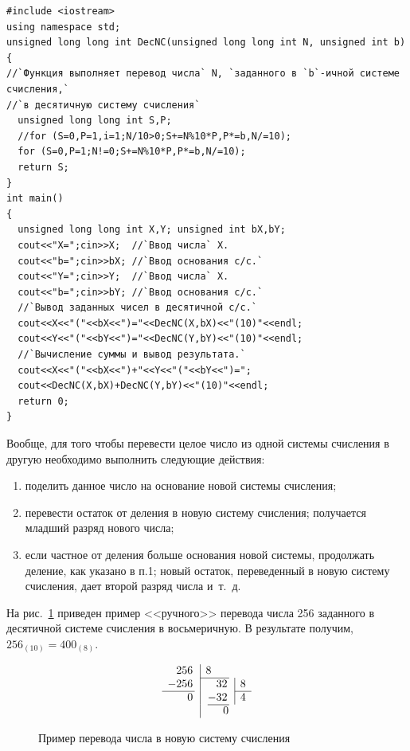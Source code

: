 \begin{lstlisting}
#include <iostream>
using namespace std;
unsigned long long int DecNC(unsigned long long int N, unsigned int b)
{
//`Функция выполняет перевод числа` N, `заданного в `b`-ичной системе счисления,` 
//`в десятичную систему счисления`
  unsigned long long int S,P;
  //for (S=0,P=1,i=1;N/10>0;S+=N%10*P,P*=b,N/=10);
  for (S=0,P=1;N!=0;S+=N%10*P,P*=b,N/=10);
  return S;
}
int main()
{
  unsigned long long int X,Y; unsigned int bX,bY;
  cout<<"X=";cin>>X;  //`Ввод числа` X.
  cout<<"b=";cin>>bX; //`Ввод основания с/с.`
  cout<<"Y=";cin>>Y;  //`Ввод числа` X.
  cout<<"b=";cin>>bY; //`Ввод основания с/с.`
  //`Вывод заданных чисел в десятичной с/с.`
  cout<<X<<"("<<bX<<")="<<DecNC(X,bX)<<"(10)"<<endl;
  cout<<Y<<"("<<bY<<")="<<DecNC(Y,bY)<<"(10)"<<endl;
  //`Вычисление суммы и вывод результата.`
  cout<<X<<"("<<bX<<")+"<<Y<<"("<<bY<<")=";
  cout<<DecNC(X,bX)+DecNC(Y,bY)<<"(10)"<<endl;
  return 0;
}
\end{lstlisting}



Вообще, для того чтобы перевести целое число из одной системы счисления в другую необходимо выполнить следующие
действия:

\begin{enumerate}
\item поделить данное число на основание новой системы счисления;
\item перевести остаток от деления в новую систему счисления; получается младший разряд нового числа;
\item если частное от деления больше основания новой системы, продолжать деление, как указано в п.1; новый остаток,
переведенный в новую систему счисления, дает второй разряд числа и~т.~д.
\end{enumerate}
На рис.~\ref{ch04:refDrawing0} 
приведен пример <<ручного>> перевода числа 256 заданного в десятичной системе 
счисления в восьмеричную. В
результате получим,  $256_{(10)}=400_{(8)}$.
\begin{figure}[h]
\begin{minipage}[b]{0.5\textwidth}
$$
\begin{array}{r@{\,}l|l@{\,}l@{\,}l|l}
256 && \multicolumn{4}{l}8\\\cline{3-4}
- 256 &&& \phantom{-}32 &&8\\\cline{1-1}\cline{6-6}
 0 &&& - 32 && 4 \\\cline{4-4}
  && \multicolumn{4}{c}0\\
\end{array}
$$
\caption{Пример перевода числа в новую систему счисления}
\label{ch04:refDrawing0}
\end{minipage}
\end{figure}

